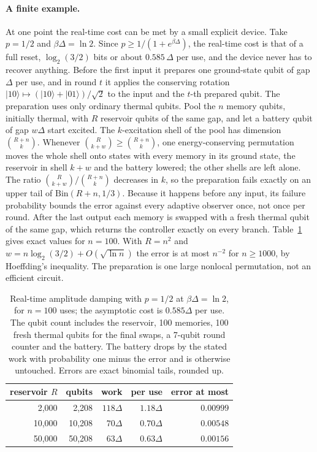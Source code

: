 \documentclass[11pt]{article}
\theoremstyle{definition}
\theoremstyle{remark}
\begin{document}
\paragraph{A finite example.} At one point the real-time cost can be met by a small explicit device. Take $p=1/2$ and $\beta\Delta=\ln2$. Since $p\ge1/(1+e^{\beta\Delta})$, the real-time cost is that of a full reset, $\log_2(3/2)$ bits or about $0.585\,\Delta$ per use, and the device never has to recover anything. Before the first input it prepares one ground-state qubit of gap $\Delta$ per use, and in round $t$ it applies the conserving rotation $|10\rangle\mapsto(|10\rangle+|01\rangle)/\sqrt2$ to the input and the $t$-th prepared qubit. The preparation uses only ordinary thermal qubits. Pool the $n$ memory qubits, initially thermal, with $R$ reservoir qubits of the same gap, and let a battery qubit of gap $w\Delta$ start excited. The $k$-excitation shell of the pool has dimension $\binom{R+n}{k}$. Whenever $\binom{R}{k+w}\ge\binom{R+n}{k}$, one energy-conserving permutation moves the whole shell onto states with every memory in its ground state, the reservoir in shell $k+w$ and the battery lowered; the other shells are left alone. The ratio $\binom{R}{k+w}/\binom{R+n}{k}$ decreases in $k$, so the preparation fails exactly on an upper tail of $\mathrm{Bin}(R+n,1/3)$. Because it happens before any input, its failure probability bounds the error against every adaptive observer once, not once per round. After the last output each memory is swapped with a fresh thermal qubit of the same gap, which returns the controller exactly on every branch. Table~\ref{tab:finite} gives exact values for $n=100$. With $R=n^2$ and $w=n\log_2(3/2)+O(\sqrt{\ln n})$ the error is at most $n^{-2}$ for $n\ge1000$, by Hoeffding's inequality. The preparation is one large nonlocal permutation, not an efficient circuit.

\begin{table}[t]
\centering
\begin{tabular}{rrrrr}
reservoir $R$ & qubits & work & per use & error at most\\\hline
2{,}000  & 2{,}208  & $118\Delta$ & $1.18\Delta$ & $0.00999$\\
10{,}000 & 10{,}208 & $70\Delta$  & $0.70\Delta$ & $0.00548$\\
50{,}000 & 50{,}208 & $63\Delta$  & $0.63\Delta$ & $0.00156$
\end{tabular}
\caption{Real-time amplitude damping with $p=1/2$ at $\beta\Delta=\ln2$, for $n=100$ uses; the asymptotic cost is $0.585\Delta$ per use. The qubit count includes the reservoir, 100 memories, 100 fresh thermal qubits for the final swaps, a 7-qubit round counter and the battery. The battery drops by the stated work with probability one minus the error and is otherwise untouched. Errors are exact binomial tails, rounded up.}
\label{tab:finite}
\end{table}
\end{document}
